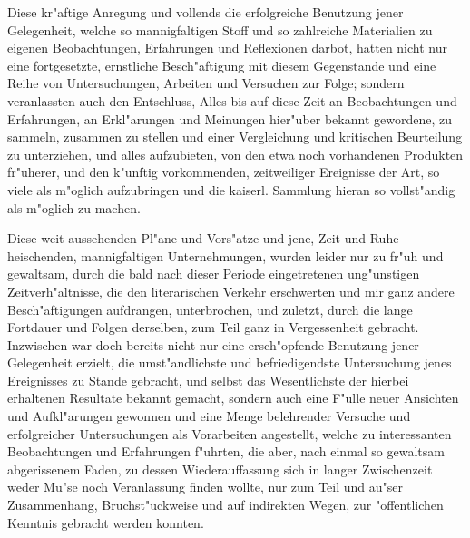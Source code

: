 \documentclass[a4paper, 11pt, oneside, german]{article}
\begin{document}
Diese kr"aftige Anregung und vollends die erfolgreiche Benutzung jener Gelegenheit, welche so mannigfaltigen Stoff und so zahlreiche Materialien zu eigenen Beobachtungen, Erfahrungen und Reflexionen darbot, hatten nicht nur eine fortgesetzte, ernstliche Besch"aftigung mit diesem Gegenstande und eine Reihe von Untersuchungen, Arbeiten und Versuchen zur Folge; sondern veranlassten auch den Entschluss, Alles bis auf diese Zeit an Beobachtungen und Erfahrungen, an Erkl"arungen und Meinungen hier"uber bekannt gewordene, zu sammeln, zusammen zu stellen und einer Vergleichung und kritischen Beurteilung zu unterziehen, und alles aufzubieten, von den etwa noch vorhandenen Produkten fr"uherer, und den k"unftig vorkommenden, zeitweiliger Ereignisse der Art, so viele als m"oglich aufzubringen und die kaiserl. Sammlung hieran so vollst"andig als m"oglich zu machen.

Diese weit aussehenden Pl"ane und Vors"atze und jene, Zeit und Ruhe heischenden, mannigfaltigen Unternehmungen, wurden leider nur zu fr"uh und gewaltsam, durch die bald nach dieser Periode eingetretenen ung"unstigen Zeitverh"altnisse, die den literarischen Verkehr erschwerten und mir ganz andere Besch"aftigungen aufdrangen, unterbrochen, und zuletzt, durch die lange Fortdauer und Folgen derselben, zum Teil ganz in Vergessenheit gebracht. Inzwischen war doch bereits nicht nur eine ersch"opfende Benutzung jener Gelegenheit erzielt, die umst"andlichste und befriedigendste Untersuchung jenes Ereignisses zu Stande gebracht, und selbst das Wesentlichste der hierbei erhaltenen Resultate bekannt gemacht, sondern auch eine F"ulle neuer Ansichten und Aufkl"arungen gewonnen und eine Menge belehrender Versuche und erfolgreicher Untersuchungen als Vorarbeiten angestellt, welche zu interessanten Beobachtungen und Erfahrungen f"uhrten, die aber, nach einmal so gewaltsam abgerissenem Faden, zu dessen Wiederauffassung sich in langer Zwischenzeit weder Mu"se noch Veranlassung finden wollte, nur zum Teil und au"ser Zusammenhang, Bruchst"uckweise und auf indirekten Wegen, zur "offentlichen Kenntnis gebracht werden konnten.
\end{document}
